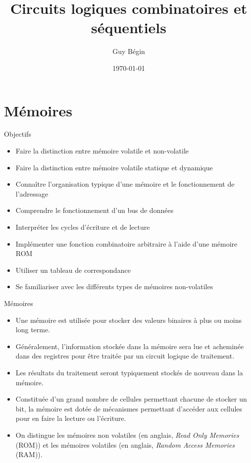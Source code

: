 \documentclass[presentation]{beamer}
\author{Guy Bégin}
\date{\today}
\title{Circuits logiques combinatoires et séquentiels}
\begin{document}
\maketitle

\section{Mémoires}
\label{sec:org997ba6e}
\begin{frame}[label={sec:orgc88465a}]{Objectifs}
\begin{itemize}
\item Faire la distinction entre mémoire volatile et non-volatile
\item Faire la distinction entre mémoire volatile statique et dynamique
\item Connaître l'organisation typique d'une mémoire et le fonctionnement
de l'adressage
\item Comprendre le fonctionnement d'un bus de données
\item Interpréter les cycles d'écriture et de lecture
\item Implémenter une fonction combinatoire arbitraire à l'aide d'une
mémoire ROM
\item Utiliser un tableau de correspondance
\item Se familiariser avec les différents types de mémoires non-volatiles
\end{itemize}
\end{frame}

\begin{frame}[label={sec:org81e9f23}]{Mémoires}
\begin{itemize}
\item Une mémoire est utilisée pour stocker des valeurs binaires à plus ou moins long terme.

\item Généralement, l'information stockée dans la mémoire sera lue et acheminée dans des registres pour être traitée par un circuit logique de traitement.

\item Les résultats du traitement seront typiquement stockés de nouveau dans la mémoire.

\item Constituée d'un grand nombre de cellules permettant chacune de stocker un bit, la mémoire est dotée de mécanismes permettant d'accéder aux cellules pour en faire la lecture ou l'écriture.

\item On distingue les mémoires non volatiles (en anglais, \emph{Read Only Memories} (ROM)) et les mémoires volatiles (en anglais, \emph{Random Access Memories} (RAM)).
\end{itemize}
\end{frame}
\end{document}
